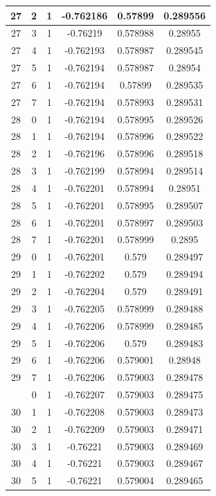 \documentclass[12pt,a4paper]{article}
\numberwithin{equation}{section}
\numberwithin{figure}{section}
\numberwithin{table}{section}
\begin{document}
\begin{longtable}{|c|c|c|c|c|c|}
27 & 2 & 1 & -0.762186 & 0.57899 & 0.289556 \\ \hline
27 & 3 & 1 & -0.76219 & 0.578988 & 0.28955 \\ \hline
27 & 4 & 1 & -0.762193 & 0.578987 & 0.289545 \\ \hline
27 & 5 & 1 & -0.762194 & 0.578987 & 0.28954 \\ \hline
27 & 6 & 1 & -0.762194 & 0.57899 & 0.289535 \\ \hline
27 & 7 & 1 & -0.762194 & 0.578993 & 0.289531 \\ \hline
28 & 0 & 1 & -0.762194 & 0.578995 & 0.289526 \\ \hline
28 & 1 & 1 & -0.762194 & 0.578996 & 0.289522 \\ \hline
28 & 2 & 1 & -0.762196 & 0.578996 & 0.289518 \\ \hline
28 & 3 & 1 & -0.762199 & 0.578994 & 0.289514 \\ \hline
28 & 4 & 1 & -0.762201 & 0.578994 & 0.28951 \\ \hline
28 & 5 & 1 & -0.762201 & 0.578995 & 0.289507 \\ \hline
28 & 6 & 1 & -0.762201 & 0.578997 & 0.289503 \\ \hline
28 & 7 & 1 & -0.762201 & 0.578999 & 0.2895 \\ \hline
29 & 0 & 1 & -0.762201 & 0.579 & 0.289497 \\ \hline
29 & 1 & 1 & -0.762202 & 0.579 & 0.289494 \\ \hline
29 & 2 & 1 & -0.762204 & 0.579 & 0.289491 \\ \hline
29 & 3 & 1 & -0.762205 & 0.578999 & 0.289488 \\ \hline
29 & 4 & 1 & -0.762206 & 0.578999 & 0.289485 \\ \hline
29 & 5 & 1 & -0.762206 & 0.579 & 0.289483 \\ \hline
29 & 6 & 1 & -0.762206 & 0.579001 & 0.28948 \\ \hline
29 & 7 & 1 & -0.762206 & 0.579003 & 0.289478 \\ \hline
\pagebreak
30 & 0 & 1 & -0.762207 & 0.579003 & 0.289475 \\ \hline
30 & 1 & 1 & -0.762208 & 0.579003 & 0.289473 \\ \hline
30 & 2 & 1 & -0.762209 & 0.579003 & 0.289471 \\ \hline
30 & 3 & 1 & -0.76221 & 0.579003 & 0.289469 \\ \hline
30 & 4 & 1 & -0.76221 & 0.579003 & 0.289467 \\ \hline
30 & 5 & 1 & -0.76221 & 0.579004 & 0.289465 \\ \hline

\end{longtable}
\end{document}
